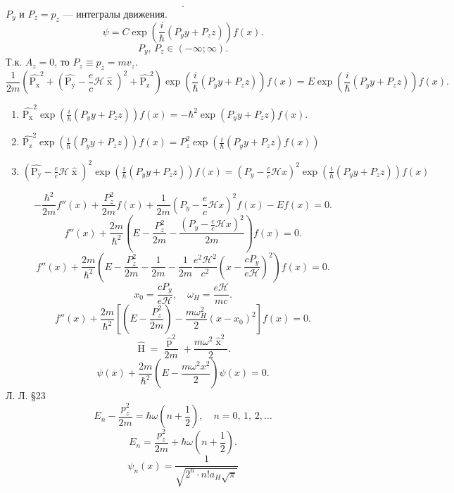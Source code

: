 \documentclass[a4paper]{article}
\begin{document}
\begin{sol}
\[.\] 
$P_y$ и $P_z=p_z$ --- интегралы движения.
\[
	\psi=C \exp \left( \frac{i}{\hbar }\left( 
	P_y y+P_z z\right)  \right) f(x)
.\] 
\[
	P_y,\,P_z \in \left( -\infty;\infty \right) 
.\] 
Т.\:к. $A_z=0$, то $P_z\equiv p_z=m v_z$.
\[
	\frac{1}{2m}\left( \widehat{\operatorname{P_x}}^2+
	\left( \widehat{\operatorname{P_y}}-\frac{e}{c}\mathcal{H}
\widehat{\operatorname{x}}\right) ^2+ \widehat{\operatorname{P_z}}^2\right) \exp \left( \frac{i}{\hbar } \left( P_y y+ P_z z \right)  \right) f(x)= E \exp \left( \frac{i}{\hbar } \left( P_y y +P_z z \right)  \right) f(x)
.\] 
\begin{enumerate}
\item $\displaystyle 
	\widehat{\operatorname{P_x}}^2 \exp \left( \frac{i}{\hbar }
	\left( P_y y +P_z z \right) \right) f(x)= - \hbar^2
	\exp \left( P_y y +P_z z \right) f(x)
.$
\item $\displaystyle  \widehat{\operatorname{P_z}}^2 \exp \left( 
	\frac{i}{\hbar} \left( P_y y+ P_z z \right) \right) f(x)=
	P_z^2 \exp \left( \frac{i}{\hbar }\left( P_y y+P_z z \right) f(x) \right) $
\item $\displaystyle \left( \widehat{\operatorname{P_y}}-\frac{e}{c}
	\mathcal{H} \widehat{\operatorname{x}}\right) ^2
	\exp \left( \frac{i}{\hbar }\left( P_y y+P_z z \right)  \right) f(x)= \left( P_y-\frac{e}{c} \mathcal{H} x \right) ^2 \exp
	\left( \frac{i}{\hbar }\left( P_y y+P_z z \right)  \right) 
	f(x)$
\end{enumerate} 
\[
	-\frac{\hbar^2}{ 2m} f''(x) +\frac{P_z^2}{2m}
	f(x) +\frac{1}{2m} \left( P_y- \frac{e}{c} \mathcal{H}
	x\right) ^2 f(x)-Ef(x)=0
.\] 
\[
	f''(x)+ \frac{2m}{\hbar^2} \left( E - \frac{P_z^2}{2m}
	- \frac{\left(P_y- \frac{e}{c} \mathcal{H}x\right)^2}{2m}\right) f(x)=0
.\] 
\[
	f''(x)+ \frac{2m}{\hbar^2}\left( E- \frac{P_z^2}{2m}-\frac{1}{2m}-\frac{1}{2m} \frac{e^2 \mathcal{H}^2}{c^2}\left( x- \frac{cP_y}{e\mathcal{H}} \right) ^2 \right) f(x)=0
.\] 
\[
	x_0= \frac{c P_y}{e\mathcal{H}},\quad \omega_H= \frac{e\mathcal{H}}{mc}
.\] 
\[
	f''(x)+ \frac{2m}{\hbar^2} \left[ \left( E-\frac{P_z^2}{2m} \right) - \frac{m \omega_H^2}{2}(x-x_0)^2 \right] f(x)=0
.\] 
\[
\widehat{\operatorname{H}}= \frac{\widehat{\operatorname{p}}^2}{2m}
+ \frac{m \omega^2 \widehat{\operatorname{x}}^2}{2}
.\] 
\[
	\psi(x)+ \frac{2m}{\hbar^2}\left( E- \frac{m\omega^2 x^2}{2} \right) \psi(x)=0
.\] 
Л. Л. \S 23
\[
	E_n- \frac{p_z^2}{2m}= \hbar \omega \left( n+\frac{1}{2} \right),\quad n=0,\,1,\,2,\ldots
\]
\[
	E_n= \frac{p_z^2}{2m}+ \hbar \omega \left( n+\frac{1}{2} \right) 
.\] 
\[
	\psi_n (x) = \frac{1}{\sqrt{2^n \cdot n! a_H \sqrt{\pi} } }
\]
\end{sol}
\end{document}
